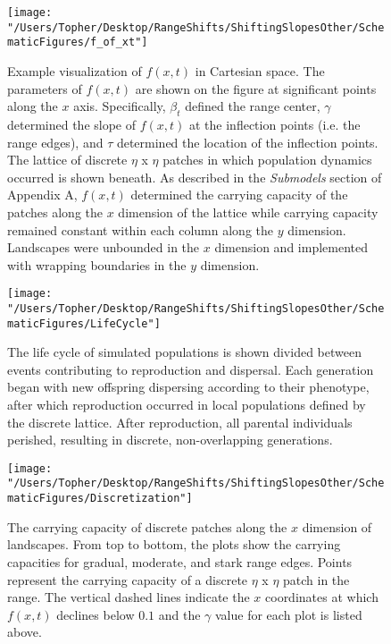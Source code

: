 \documentclass[11pt]{article}
\begin{document}
\begin{figure}[h!]
\texttt{[image: "/Users/Topher/Desktop/RangeShifts/ShiftingSlopesOther/SchematicFigures/f\_of\_xt"]}
\caption{Example visualization of $f(x,t)$ in Cartesian space. The parameters of $f(x,t)$ are shown on the figure at significant points along the $x$ axis. Specifically, $\beta_{t}$ defined the range center, $\gamma$ determined the slope of $f(x,t)$ at the inflection points (i.e. the range edges), and $\tau$ determined the location of the inflection points. The lattice of discrete $\eta$ x $\eta$ patches in which population dynamics occurred is shown beneath. As described in the \textit{Submodels} section of Appendix A, $f(x,t)$ determined the carrying capacity of the patches along the $x$ dimension of the lattice while carrying capacity remained constant within each column along the $y$ dimension. Landscapes were unbounded in the $x$ dimension and implemented with wrapping boundaries in the $y$ dimension.}
\label{Fig:EnvFunction}
\end{figure}

\clearpage

\begin{figure}[h!]
\texttt{[image: "/Users/Topher/Desktop/RangeShifts/ShiftingSlopesOther/SchematicFigures/LifeCycle"]}
\caption{The life cycle of simulated populations is shown divided between events contributing to reproduction and dispersal. Each generation began with new offspring dispersing according to their phenotype, after which reproduction occurred in local populations defined by the discrete lattice. After reproduction, all parental individuals perished, resulting in discrete, non-overlapping generations.}
\label{Fig:LifeCycle}
\end{figure}

\clearpage

\begin{figure}[h!]
\texttt{[image: "/Users/Topher/Desktop/RangeShifts/ShiftingSlopesOther/SchematicFigures/Discretization"]}
\caption{The carrying capacity of discrete patches along the $x$ dimension of landscapes. From top to bottom, the plots show the carrying capacities for gradual, moderate, and stark range edges. Points represent the carrying capacity of a discrete $\eta$ x $\eta$ patch in the range. The vertical dashed lines indicate the $x$ coordinates at which $f(x,t)$ declines below $0.1$ and the $\gamma$ value for each plot is listed above.}
\label{Fig:LifeCycle}
\end{figure}
\end{document}
